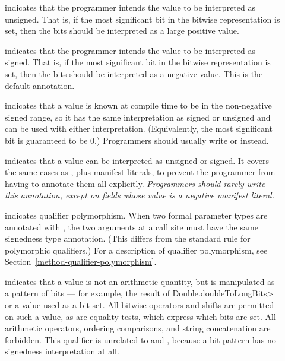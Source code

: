 \begin{description}

\item[]
    indicates that the programmer intends the value to be
    interpreted as unsigned.
    That is, if the most significant bit in the bitwise representation is
    set, then the bits should be interpreted as a large positive value.

\item[]
    indicates that the programmer intends the value to be
    interpreted as signed.
    That is, if the most significant bit in the bitwise representation is
    set, then the bits should be interpreted as a negative value.
    This is the default annotation.

\item[]
    indicates that a value is known at compile time to be in the non-negative
    signed range, so it has the same interpretation as signed or unsigned
    and can be used with either interpretation.  (Equivalently, the most
    significant bit is guaranteed to be 0.)  Programmers should usually
    write  or
     instead.

\item[]
    indicates that a value can be interpreted as unsigned or signed.  It
    covers the same cases as
    , plus manifest literals, to
    prevent the programmer from having to annotate them all explicitly.
    \emph{Programmers should rarely write this annotation,
    except on fields whose value is a negative manifest literal.}

 \item[]
   indicates qualifier polymorphism.
   When two formal parameter types are annotated with
   , the two arguments
   at a call site
   must have the same signedness type annotation.  (This differs from the
   standard rule for polymorphic qualifiers.)
   For a description of qualifier polymorphism, see
   Section~\ref{method-qualifier-polymorphism}.

\item[]
    indicates that a value is not an arithmetic quantity, but is manipulated as
    a pattern of bits --- for example, the result of
    \<Double.doubleToLongBits> or a value used as a bit set.
    All bitwise operators and shifts are permitted on such a value, as are
    equality tests, which express which bits are set.  All arithmetic
    operators, ordering comparisons, and string concatenation are forbidden.
    This qualifier is unrelated to
     and
    , because a bit pattern
    has no signedness interpretation at all.


\end{description}
